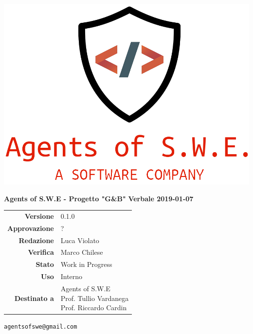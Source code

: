 


\begin{titlepage}
\thispagestyle{empty}

\begin{center}


\includegraphics[scale=0.3]{./images/logo.png} 


\large \textbf{Agents of S.W.E - Progetto "G\&B"}
\vfill
\Huge \textbf{Verbale 2019-01-07}
\vfill
\large
\renewcommand{\arraystretch}{1.3}
\begin{tabular}{r|l}
\textbf{Versione} & 0.1.0\\
\textbf{Approvazione} & ?\\
\textbf{Redazione} & \parbox[t]{5cm}{Luca Violato}\\
\textbf{Verifica} & \parbox[t]{5cm}{Marco Chilese}\\
\textbf{Stato} & Work in Progress\\
\textbf{Uso} & Interno\\
\textbf{Destinato a} & \parbox[t]{5cm}{Agents of S.W.E \\Prof. Tullio Vardanega\\Prof. Riccardo Cardin}
\end{tabular}
\vfill
\small
\texttt{agentsofswe@gmail.com}
\end{center}
\end{titlepage}

\pagebreak



\pagebreak


	








